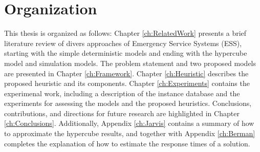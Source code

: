 \section{Organization}
This thesis is organized as follows:
Chapter \ref{ch:RelatedWork}
presents a brief literature review
of divers approaches of Emergency Service Systems (ESS),
starting with the simple deterministic models
and ending with the hypercube model and simulation models.
The problem statement
and two proposed models are presented in Chapter \ref{ch:Framework}.
Chapter \ref{ch:Heuristic} describes the proposed heuristic
and its components.
Chapter \ref{ch:Experiments} contains
the experimenal work,
including a description of the instance database
and the experiments for assessing the models
and the proposed heuristics.
Conclusions, contributions, 
and directions for future research
are highlighted in Chapter \ref{ch:Conclusions}.
Additionally, Appendix \ref{ch:Jarvis}
contains a summary of how to approximate the hypercube results,
and together with Appendix \ref{ch:Berman}
completes the explanation of how to estimate
the response times of a solution.
